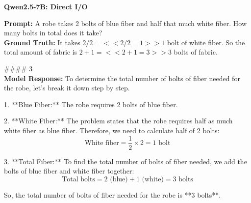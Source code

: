 
\begin{figure*}


\begin{AIbox}{\bf{\large Qwen2.5-7B: Direct I/O}}
\vspace{0.5cm}

\textbf{Prompt:} A robe takes 2 bolts of blue fiber and half that much white fiber.  How many bolts in total does it take?
\\

\textbf{Ground Truth:} It takes $2/2=<<2/2=1>>1$ bolt of white fiber. So the total amount of fabric is $2+1=<<2+1=3>>3$ bolts of fabric.

\#\#\#\# 3 
\\

\textbf{Model Response:} To determine the total number of bolts of fiber needed for the robe, let's break it down step by step.

1. **Blue Fiber:** The robe requires 2 bolts of blue fiber.

2. **White Fiber:** The problem states that the robe requires half as much white fiber as blue fiber. Therefore, we need to calculate half of 2 bolts:
   \[
   \text{White fiber} = \frac{1}{2} \times 2 = 1 \text{ bolt}
   \]

3. **Total Fiber:** To find the total number of bolts of fiber needed, we add the bolts of blue fiber and white fiber together:
   \[
   \text{Total bolts} = 2 \text{ (blue)} + 1 \text{ (white)} = 3 \text{ bolts}
   \]

So, the total number of bolts of fiber needed for the robe is **3 bolts**.

\end{AIbox}
\caption{Example of Direct (I/O) Reasoning with Qwen2.5-7B-Instruct. We can observe model is generating reasoning step with no explicit chain-of-thought prompting.}
\end{figure*}



